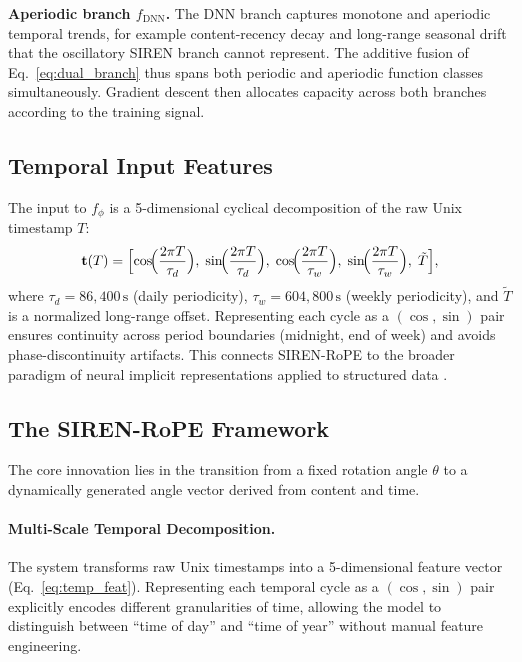 \documentclass{article}
\begin{document}
\textbf{Aperiodic branch $f_{\mathrm{DNN}}$.}
The DNN branch captures monotone and aperiodic temporal trends, for example
content-recency decay and long-range seasonal drift that the oscillatory SIREN
branch cannot represent. The additive fusion of Eq.~\eqref{eq:dual_branch}
thus spans both periodic and aperiodic function classes simultaneously.
Gradient descent then allocates capacity across both branches according to
the training signal.

\subsection{Temporal Input Features}

The input to $f_\phi$ is a 5-dimensional cyclical decomposition of the raw
Unix timestamp $T$:
\begin{equation}
  \mathbf{t}(T) = \Bigl[
    \cos\!\Bigl(\frac{2\pi T}{\tau_d}\Bigr),\;
    \sin\!\Bigl(\frac{2\pi T}{\tau_d}\Bigr),\;
    \cos\!\Bigl(\frac{2\pi T}{\tau_w}\Bigr),\;
    \sin\!\Bigl(\frac{2\pi T}{\tau_w}\Bigr),\;
    \tilde{T}
  \Bigr],
  \label{eq:temp_feat}
\end{equation}
where $\tau_d = 86{,}400\,\mathrm{s}$ (daily periodicity), $\tau_w =
604{,}800\,\mathrm{s}$ (weekly periodicity), and $\tilde{T}$ is a normalized
long-range offset. Representing each cycle as a $(\cos, \sin)$ pair ensures
continuity across period boundaries (midnight, end of week) and avoids
phase-discontinuity artifacts. This connects SIREN-RoPE to the broader
paradigm of neural implicit representations applied to structured
data \citep{sitzmann2020siren,fons2022hypertime}.

\subsection{The SIREN-RoPE Framework}

The core innovation lies in the transition from a fixed rotation angle $\theta$ to a dynamically generated angle vector derived from content and time.

\paragraph{Multi-Scale Temporal Decomposition.}
The system transforms raw Unix timestamps into a 5-dimensional feature vector
(Eq.~\eqref{eq:temp_feat}). Representing each temporal cycle as a $(\cos, \sin)$ pair
explicitly encodes different granularities of time, allowing the model to distinguish
between ``time of day'' and ``time of year'' without manual feature engineering.
\end{document}
